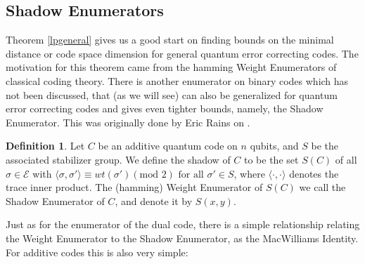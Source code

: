 \documentclass[12pt,a4paper,BCOR15mm,twoside,DIV12]{article}
\def\E{\mathcal{E}}
\def\fa{\text{ for all }}
\theoremstyle{definition}
\newtheorem{defn}[Satz]{Definition}
\begin{document}
\subsection{Shadow Enumerators}

Theorem \ref{lpgeneral} gives us a good start on finding bounds on the minimal distance or code space dimension for general quantum error correcting codes.
The motivation for this theorem came from the hamming Weight Enumerators of classical coding theory. There is another enumerator on binary codes which has not been discussed, that (as we will see) can also be generalized for quantum error correcting codes and gives even tighter bounds, namely, the Shadow Enumerator.
This was originally done by Eric Rains on \cite{shadow}.

\begin{defn}
Let $C$ be an additive quantum code on $n$ qubits, and $S$ be the associated stabilizer group. We define the shadow of $C$ to be the set $S(C)$ of all $\sigma \in \E$ with $\langle \sigma, \sigma' \rangle \equiv wt(\sigma') (\text{mod }2) \fa \sigma' \in S$, where $\langle \cdot , \cdot \rangle$ denotes the trace inner product.
The (hamming) Weight Enumerator of $S(C)$ we call the Shadow Enumerator of $C$, and denote it by $S(x,y)$.
\end{defn}

Just as for the enumerator of the dual code, there is a simple relationship relating the Weight Enumerator to the Shadow Enumerator, as the MacWilliams Identity. For additive codes this is also very simple:
\end{document}
